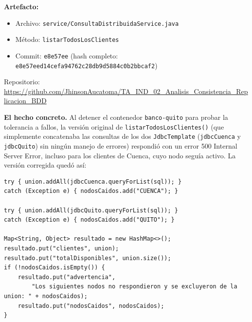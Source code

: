 \documentclass[11pt]{article}
\begin{document}
    \noindent\textbf{Artefacto:}
    \begin{itemize}[noitemsep,topsep=2pt]
  \item Archivo: \texttt{service/ConsultaDistribuidaService.java}
  \item Método: \texttt{listarTodosLosClientes}
  \item Commit: \texttt{e8e57ee} (hash completo: \texttt{e8e57eed14cefa94762c28db9d5884c0b2bbcaf2})
    \end{itemize}
    \noindent Repositorio: {\footnotesize\url{https://github.com/JhinsonAucatoma/TA_IND_02_Analisis_Consistencia_Replicacion_BDD}}

    \noindent\textbf{El hecho concreto.}
    Al detener el contenedor \texttt{banco-quito} para probar la tolerancia a fallos, la versión original de \texttt{listarTodosLosClientes()} (que simplemente concatenaba las consultas de los dos \texttt{JdbcTemplate} (\texttt{jdbcCuenca} y \texttt{jdbcQuito}) sin ningún manejo de errores) respondió con un error 500 Internal Server Error, incluso para los clientes de Cuenca, cuyo nodo seguía activo. La versión corregida quedó así:

    \begin{lstlisting}[style=javastyle, caption={Fragmento de \texttt{listarTodosLosClientes} con manejo de fallos por nodo.}, label={lst:ev3-fallback}]
try { union.addAll(jdbcCuenca.queryForList(sql)); }
catch (Exception e) { nodosCaidos.add("CUENCA"); }

try { union.addAll(jdbcQuito.queryForList(sql)); }
catch (Exception e) { nodosCaidos.add("QUITO"); }

Map<String, Object> resultado = new HashMap<>();
resultado.put("clientes", union);
resultado.put("totalDisponibles", union.size());
if (!nodosCaidos.isEmpty()) {
    resultado.put("advertencia",
        "Los siguientes nodos no respondieron y se excluyeron de la union: " + nodosCaidos);
    resultado.put("nodosCaidos", nodosCaidos);
}
    \end{lstlisting}
\end{document}

